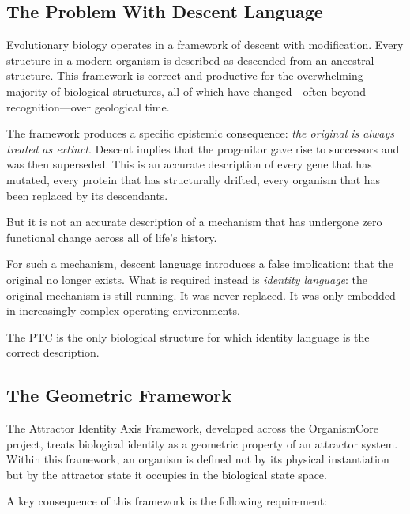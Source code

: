 \documentclass[11pt]{article}
\theoremstyle{definition}
\begin{document}
\subsection{The Problem With Descent Language}

Evolutionary biology operates in a framework of descent with modification.
Every structure in a modern organism is described as descended from an
ancestral structure.
This framework is correct and productive for the overwhelming majority
of biological structures, all of which have changed---often beyond
recognition---over geological time.

The framework produces a specific epistemic consequence:
\emph{the original is always treated as extinct}.
Descent implies that the progenitor gave rise to successors and was
then superseded.
This is an accurate description of every gene that has mutated,
every protein that has structurally drifted,
every organism that has been replaced by its descendants.

But it is not an accurate description of a mechanism that has undergone
zero functional change across all of life's history.

For such a mechanism, descent language introduces a false implication:
that the original no longer exists.
What is required instead is \emph{identity language}:
the original mechanism is still running.
It was never replaced.
It was only embedded in increasingly complex operating environments.

The PTC is the only biological structure for which identity language
is the correct description.

\subsection{The Geometric Framework}

The Attractor Identity Axis Framework, developed across the OrganismCore
project, treats biological identity as a geometric property of an
attractor system.
Within this framework, an organism is defined not by its physical
instantiation but by the attractor state it occupies in
the biological state space.

A key consequence of this framework is the following requirement:
\end{document}
